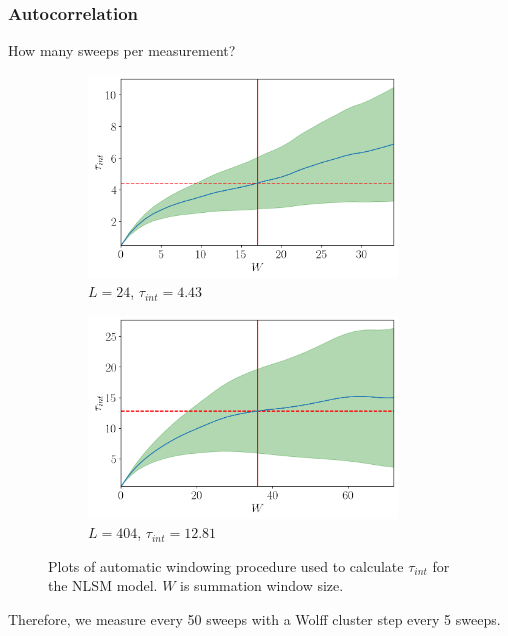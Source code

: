 \documentclass{beamer}
\begin{document}
\begin{frame}
    \frametitle{Autocorrelation}
    How many sweeps per measurement?
    \begin{figure}[h]
      \centering
          \begin{subfigure}[b]{0.5\textwidth}\centering
            \includegraphics[width=0.9\textwidth]{imgs/tauint24.png}
            \caption{$L=24$, $\tau_{int}=4.43$}
          \end{subfigure}%
          \hfill
          \begin{subfigure}[b]{0.5\textwidth}\centering
            \includegraphics[width=0.9\textwidth]{imgs/tauint404.png}
            \caption{$L=404$, $\tau_{int}=12.81$}
          \end{subfigure}
          \hfill
          \caption{\label{fig:tauint} Plots of automatic windowing procedure used to calculate $\tau_{int}$ for the NLSM model. $W$ is summation window size.}
    \end{figure}
    Therefore, we measure every 50 sweeps with a Wolff cluster step every 5 sweeps.
\end{frame}
\end{document}
